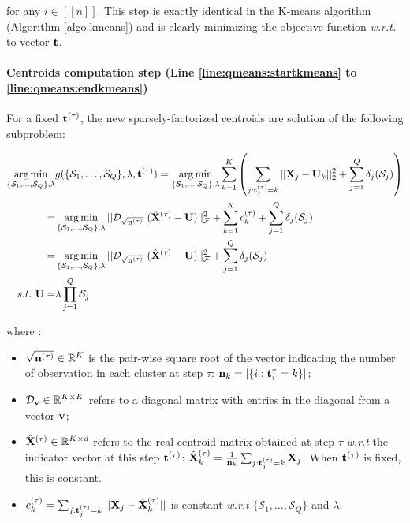 \documentclass{article}
\begin{document}
for any $i \in [\![n]\!]$. This step is exactly identical in the K-means algorithm (Algorithm \ref{algo:kmeans}) and is clearly minimizing the objective function \textit{w.r.t.} to vector ${\mathbf{t}}$.

\paragraph{Centroids computation step (Line \ref{line:qmeans:startkmeans} to \ref{line:qmeans:endkmeans})} For a fixed ${\mathbf{t}}^{(\tau)}$, the new sparsely-factorized centroids are solution of the following subproblem:

\begin{equation}
\label{eq:qmeans_problem_t_fixed}
\begin{split}
 \operatorname*{arg\,min}_{\{ \mathcal{S}_1, \ldots,\mathcal{S}_Q\}, \lambda} & g(\{ \mathcal{S}_1, \ldots,\mathcal{S}_Q\}, \lambda, {\mathbf{t}}^{(\tau)}) = \operatorname*{arg\,min}_{\{ \mathcal{S}_1, \ldots,\mathcal{S}_Q\}, \lambda} \sum_{k=1}^{K} \left( \sum_{j: {\mathbf{t}}^{(\tau)}_j = k} ||{\mathbf{X}}_j - {\mathbf{U}}_k||^2_2 + \sum_{j=1}^{Q} \delta_j(\mathcal{S}_j) \right) \\
 = & \operatorname*{arg\,min}_{\{ \mathcal{S}_1, \ldots,\mathcal{S}_Q\}, \lambda}  ||\mathcal{D}_{\sqrt{{\mathbf{n}}^{(\tau)}}}~(\hat{{\mathbf{X}}}^{(\tau)} - {\mathbf{U}})||_{\mathcal{F}} ^ 2  + \sum_{k=1}^{K} c_k^{(\tau)} +  \sum_{j=1}^{Q} \delta_j(\mathcal{S}_j)\\
  = & \operatorname*{arg\,min}_{\{ \mathcal{S}_1, \ldots,\mathcal{S}_Q\}, \lambda}  ||\mathcal{D}_{\sqrt{{\mathbf{n}}^{(\tau)}}}~(\hat{{\mathbf{X}}}^{(\tau)} - {\mathbf{U}})||_{\mathcal{F}} ^ 2  +  \sum_{j=1}^{Q} \delta_j(\mathcal{S}_j)\\
 s.t. ~ {\mathbf{U}} =& \lambda \prod_{j=1}^{Q}{\mathcal{S}_j}
\end{split} 
\end{equation}

where :

\begin{itemize}
 \item $\sqrt{{\mathbf{n}}^{(\tau)}} \in {\mathbb{R}^{K}}$ is the pair-wise square root of the vector indicating the number of observation in each cluster at step $\tau$: ${\mathbf{n}}_k = |\{i: {\mathbf{t}}^\tau_i = k\}|$;
 \item $\mathcal{D}_{\mathbf{v}} \in \mathbb{R}^{K \times K}$ refers to a diagonal matrix with entries in the diagonal from a vector ${\mathbf{v}}$;
 \item $\hat{{\mathbf{X}}}^{(\tau)} \in \mathbb{R}^{K \times d}$ refers to the real centroid matrix obtained at step $\tau$ \textit{w.r.t} the indicator vector at this step ${\mathbf{t}}^{(\tau)}$: $\hat{{\mathbf{X}}}^{(\tau)}_k = \frac{1}{{\mathbf{n}}_k}\sum_{j:{\mathbf{t}}^{(\tau)}_j = k} {{\mathbf{X}}_j}$. When ${\mathbf{t}}^{(\tau)}$ is fixed, this is constant.
 \item $c_k^{(\tau)} = \sum_{j: {\mathbf{t}}^{(\tau)}_j = k}^{}||{\mathbf{X}}_j - \hat{{\mathbf{X}}}_k^{(\tau)}||$ is constant \textit{w.r.t} $\{ \mathcal{S}_1, \ldots,\mathcal{S}_Q\}$ and $\lambda$.
\end{itemize}
\end{document}

